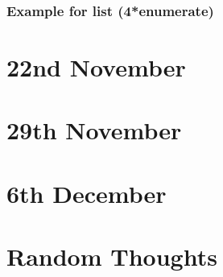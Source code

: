 \documentclass[a4paper, 11pt, twoside]{report}
\begin{document}
\subsection*{Example for list (4*enumerate)}

\chapter{22nd November}

\chapter{29th November}

\chapter{6th December}

\appendix
\chapter{Random Thoughts}

\printindex
\end{document}
